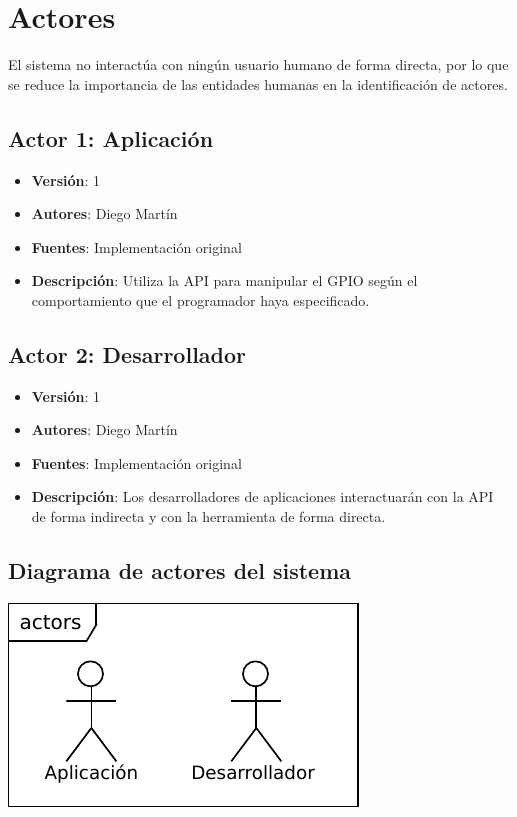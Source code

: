 \documentclass[letterpaper,10pt,spanish]{sphinxmanual}
\begin{document}
\chapter{Actores}
\label{analysis/actors:actores}\label{analysis/actors::doc}
El sistema no interactúa con ningún usuario humano de forma directa, por lo que se reduce la importancia de las entidades humanas en la identificación de actores.


\section{\textbf{Actor 1}: Aplicación}
\label{analysis/actors:actor-1-aplicacion}\begin{itemize}
\item {} 
\textbf{Versión}: 1

\item {} 
\textbf{Autores}: Diego Martín

\item {} 
\textbf{Fuentes}: Implementación original

\item {} 
\textbf{Descripción}: Utiliza la API para manipular el GPIO según el comportamiento que el programador haya especificado.

\end{itemize}


\section{\textbf{Actor 2}: Desarrollador}
\label{analysis/actors:actor-2-desarrollador}\begin{itemize}
\item {} 
\textbf{Versión}: 1

\item {} 
\textbf{Autores}: Diego Martín

\item {} 
\textbf{Fuentes}: Implementación original

\item {} 
\textbf{Descripción}: Los desarrolladores de aplicaciones interactuarán con la API de forma indirecta y con la herramienta  de forma directa.

\end{itemize}


\section{Diagrama de actores del sistema}
\label{analysis/actors:diagrama-de-actores-del-sistema}
{\hfill\includegraphics{actors.pdf}\hfill}
\end{document}
